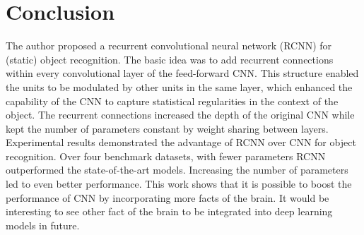 \documentclass[10pt,twocolumn,letterpaper]{article}
\begin{document}
\section{Conclusion}
The author proposed a recurrent convolutional neural network (RCNN) for (static) object recognition. The basic idea was to add recurrent connections within every convolutional layer of the feed-forward CNN. This structure enabled the units to be modulated by other units in the same layer, which enhanced the capability of the CNN to capture statistical regularities in the context of the object. The recurrent connections increased the depth of the original CNN while kept the number of parameters constant by weight sharing between layers. Experimental results demonstrated the advantage of RCNN over CNN for object recognition. Over four benchmark datasets, with fewer parameters RCNN outperformed the state-of-the-art models. Increasing the number of parameters led to even better performance. This work shows that it is possible to boost the performance of CNN by incorporating more facts of the brain. It would be interesting to see other fact of the brain to be integrated into deep learning models in future.

{\small


}
\end{document}
